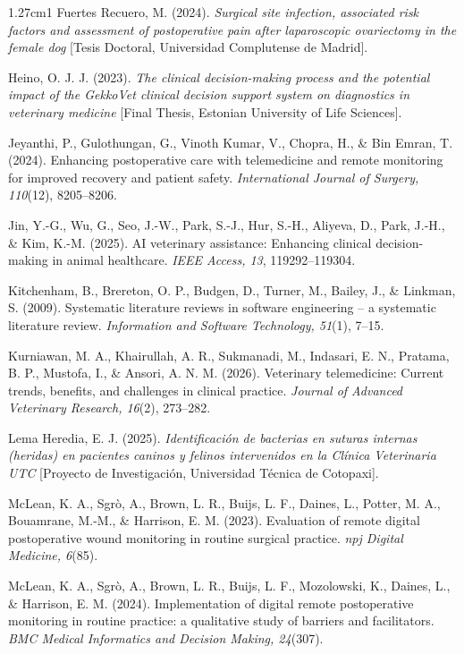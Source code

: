 \documentclass[stu, spanish]{apa7}
\begin{document}
\begin{hangparas}{1.27cm}{1}
Fuertes Recuero, M. (2024). \textit{Surgical site infection, associated risk factors and assessment of postoperative pain after laparoscopic ovariectomy in the female dog} [Tesis Doctoral, Universidad Complutense de Madrid].

Heino, O. J. J. (2023). \textit{The clinical decision-making process and the potential impact of the GekkoVet clinical decision support system on diagnostics in veterinary medicine} [Final Thesis, Estonian University of Life Sciences].

Jeyanthi, P., Gulothungan, G., Vinoth Kumar, V., Chopra, H., \& Bin Emran, T. (2024). Enhancing postoperative care with telemedicine and remote monitoring for improved recovery and patient safety. \textit{International Journal of Surgery, 110}(12), 8205--8206.

Jin, Y.-G., Wu, G., Seo, J.-W., Park, S.-J., Hur, S.-H., Aliyeva, D., Park, J.-H., \& Kim, K.-M. (2025). AI veterinary assistance: Enhancing clinical decision-making in animal healthcare. \textit{IEEE Access, 13}, 119292--119304.

Kitchenham, B., Brereton, O. P., Budgen, D., Turner, M., Bailey, J., \& Linkman, S. (2009). Systematic literature reviews in software engineering -- a systematic literature review. \textit{Information and Software Technology, 51}(1), 7--15.

Kurniawan, M. A., Khairullah, A. R., Sukmanadi, M., Indasari, E. N., Pratama, B. P., Mustofa, I., \& Ansori, A. N. M. (2026). Veterinary telemedicine: Current trends, benefits, and challenges in clinical practice. \textit{Journal of Advanced Veterinary Research, 16}(2), 273--282.

Lema Heredia, E. J. (2025). \textit{Identificaci\'{o}n de bacterias en suturas internas (heridas) en pacientes caninos y felinos intervenidos en la Cl\'{i}nica Veterinaria UTC} [Proyecto de Investigaci\'{o}n, Universidad T\'{e}cnica de Cotopaxi].

McLean, K. A., Sgr\`{o}, A., Brown, L. R., Buijs, L. F., Daines, L., Potter, M. A., Bouamrane, M.-M., \& Harrison, E. M. (2023). Evaluation of remote digital postoperative wound monitoring in routine surgical practice. \textit{npj Digital Medicine, 6}(85).

McLean, K. A., Sgr\`{o}, A., Brown, L. R., Buijs, L. F., Mozolowski, K., Daines, L., \& Harrison, E. M. (2024). Implementation of digital remote postoperative monitoring in routine practice: a qualitative study of barriers and facilitators. \textit{BMC Medical Informatics and Decision Making, 24}(307).


\end{hangparas}
\end{document}
